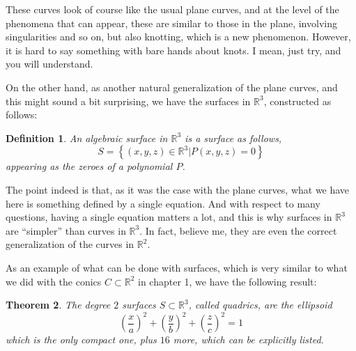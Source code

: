 \documentclass[12pt]{amsbook}
\newtheorem{theorem}{Theorem}[chapter]
\newtheorem{definition}[theorem]{Definition}
\begin{document}
These curves look of course like the usual plane curves, and at the level of the phenomena that can appear, these are similar to those in the plane, involving singularities and so on, but also knotting, which is a new phenomenon. However, it is hard to say something with bare hands about knots. I mean, just try, and you will understand.

\bigskip

On the other hand, as another natural generalization of the plane curves, and this might sound a bit surprising, we have the surfaces in $\mathbb R^3$, constructed as follows:

\begin{definition}
An algebraic surface in $\mathbb R^3$ is a surface as follows,
$$S=\left\{(x,y,z)\in\mathbb R^3\Big|P(x,y,z)=0\right\}$$
appearing as the zeroes of a polynomial $P$.
\end{definition}

The point indeed is that, as it was the case with the plane curves, what we have here is something defined by a single equation. And with respect to many questions, having a single equation matters a lot, and this is why surfaces in $\mathbb R^3$ are ``simpler'' than curves in $\mathbb R^3$. In fact, believe me, they are even the correct generalization of the curves in $\mathbb R^2$.

\bigskip

As an example of what can be done with surfaces, which is very similar to what we did with the conics $C\subset\mathbb R^2$ in chapter 1, we have the following result:

\begin{theorem}
The degree $2$ surfaces $S\subset\mathbb R^3$, called quadrics, are the ellipsoid
$$\left(\frac{x}{a}\right)^2+\left(\frac{y}{b}\right)^2+\left(\frac{z}{c}\right)^2=1$$
which is the only compact one, plus $16$ more, which can be explicitly listed.
\end{theorem}
\end{document}
